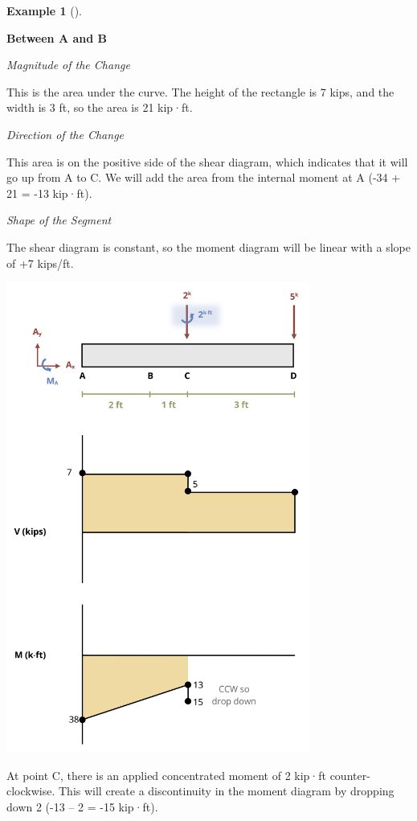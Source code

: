 \documentclass[
  letterpaper,
  DIV=11,
  numbers=noendperiod]{scrreprt}
\theoremstyle{definition}
\newtheorem{example}{Example}[chapter]
\theoremstyle{remark}
\begin{document}
\begin{tcolorbox}
\begin{example}[]
\begin{tcolorbox}
\textbf{Between A and B}

\emph{Magnitude of the Change}

This is the area under the curve. The height of the rectangle is 7 kips,
and the width is 3 ft, so the area is 21 kip·ft.

\emph{Direction of the Change}

This area is on the positive side of the shear diagram, which indicates
that it will go up from A to C. We will add the area from the internal
moment at A (-34 + 21 = -13 kip·ft).

\emph{Shape of the Segment}

The shear diagram is constant, so the moment diagram will be linear with
a slope of +7 kips/ft.

\begin{center}
\includegraphics[width=3.92708in,height=\textheight]{images/CH7 PNGs/example 7.4 part 5.png}
\end{center}

At point C, there is an applied concentrated moment of 2 kip·ft
counter-clockwise. This will create a discontinuity in the moment
diagram by dropping down 2 (-13 -- 2 = -15 kip·ft).


\end{tcolorbox}
\end{example}
\end{tcolorbox}
\end{document}

